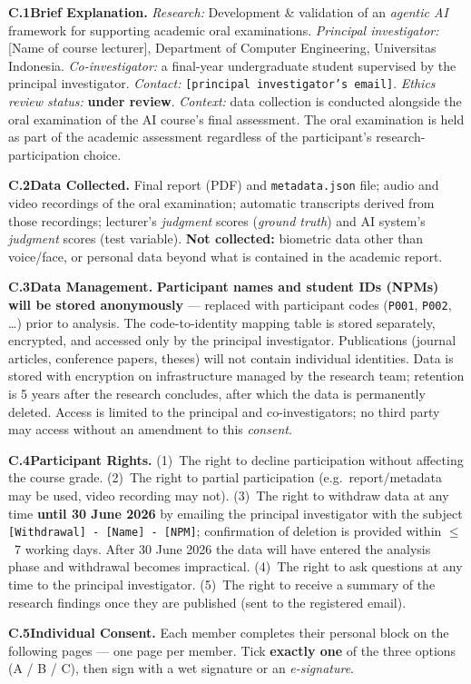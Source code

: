 \documentclass[11pt,a4paper,oneside]{report}
\begin{document}
{\small
\textbf{C.1\quad Brief Explanation.}
\textit{Research:} Development \& validation of an \textit{agentic AI} framework for supporting academic oral examinations.
\textit{Principal investigator:} [Name of course lecturer], Department of Computer Engineering, Universitas Indonesia. \textit{Co-investigator:} a final-year undergraduate student supervised by the principal investigator.
\textit{Contact:} \texttt{[principal investigator's email]}. \textit{Ethics review status:} \textbf{under review}.
\textit{Context:} data collection is conducted alongside the oral examination of the AI course's final assessment. The oral examination is held as part of the academic assessment regardless of the participant's research-participation choice.

\textbf{C.2\quad Data Collected.}
Final report (PDF) and \texttt{metadata.json} file; audio and video recordings of the oral examination; automatic transcripts derived from those recordings; lecturer's \textit{judgment} scores (\textit{ground truth}) and AI system's \textit{judgment} scores (test variable). \textbf{Not collected:} biometric data other than voice/face, or personal data beyond what is contained in the academic report.

\textbf{C.3\quad Data Management.}
\textbf{Participant names and student IDs (NPMs) will be stored anonymously} --- replaced with participant codes (\texttt{P001}, \texttt{P002}, \ldots) prior to analysis. The code-to-identity mapping table is stored separately, encrypted, and accessed only by the principal investigator. Publications (journal articles, conference papers, theses) will not contain individual identities. Data is stored with encryption on infrastructure managed by the research team; retention is 5 years after the research concludes, after which the data is permanently deleted. Access is limited to the principal and co-investigators; no third party may access without an amendment to this \textit{consent}.

\textbf{C.4\quad Participant Rights.}
(1)~The right to decline participation without affecting the course grade. (2)~The right to partial participation (e.g.\ report/metadata may be used, video recording may not). (3)~The right to withdraw data at any time \textbf{until 30 June 2026} by emailing the principal investigator with the subject \texttt{[Withdrawal] - [Name] - [NPM]}; confirmation of deletion is provided within $\le$~7 working days. After 30 June 2026 the data will have entered the analysis phase and withdrawal becomes impractical. (4)~The right to ask questions at any time to the principal investigator. (5)~The right to receive a summary of the research findings once they are published (sent to the registered email).

\textbf{C.5\quad Individual Consent.}
Each member completes their personal block on the following pages --- one page per member. Tick \textbf{exactly one} of the three options (A / B / C), then sign with a wet signature or an \textit{e-signature}.
}
\end{document}
